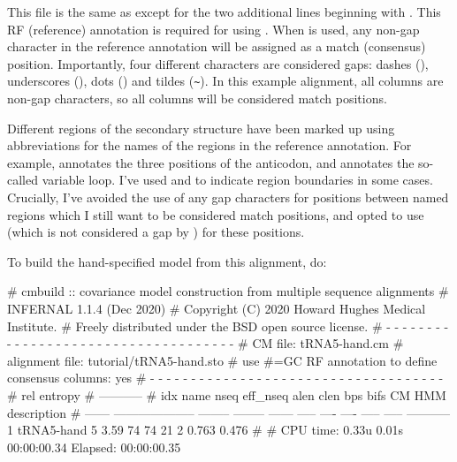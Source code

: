 This file is the same as  except for the two
additional lines beginning with . This RF (reference)
annotation is required for using . When 
is used, any non-gap character in the reference annotation will be
assigned as a match (consensus) position. Importantly, four different
characters are considered gaps: dashes (\otext{-}), underscores
(\otext{\_}), dots () and tildes (\verb+~+). In this example
alignment, all columns are non-gap characters, so all columns will be
considered match positions.

Different regions of the secondary structure have been marked up using
abbreviations for the names of the regions in the reference
annotation. For example,  annotates the three positions of
the anticodon, and \otext{[vlp]} annotates the so-called variable
loop. I've used \otext{[} and \otext{]} to indicate region boundaries
in some cases. Crucially, I've avoided the use of any gap characters
for positions between named regions which I still want to be
considered match positions, and opted to use \otext{=} (which is not
considered a gap by ) for these positions.

To build the hand-specified model from this alignment, do:


\begin{sreoutput}
# cmbuild :: covariance model construction from multiple sequence alignments
# INFERNAL 1.1.4 (Dec 2020)
# Copyright (C) 2020 Howard Hughes Medical Institute.
# Freely distributed under the BSD open source license.
# - - - - - - - - - - - - - - - - - - - - - - - - - - - - - - - - - - - -
# CM file:                                            tRNA5-hand.cm
# alignment file:                                     tutorial/tRNA5-hand.sto
# use #=GC RF annotation to define consensus columns: yes
# - - - - - - - - - - - - - - - - - - - - - - - - - - - - - - - - - - - -
#                                                                      rel entropy
#                                                                      -----------
# idx    name                     nseq eff_nseq   alen  clen  bps bifs    CM   HMM description
# ------ -------------------- -------- -------- ------ ----- ---- ---- ----- ----- -----------
       1 tRNA5-hand                  5     3.59     74    74   21    2 0.763 0.476 
#
# CPU time: 0.33u 0.01s 00:00:00.34 Elapsed: 00:00:00.35
\end{sreoutput}

